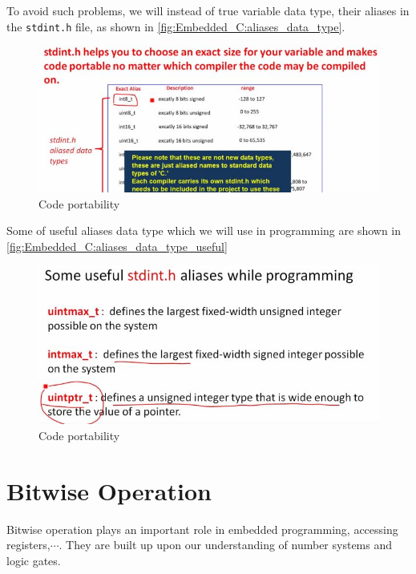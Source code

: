 \newpage
To avoid such problems, we will instead of true variable data type, their aliases in the \verb|stdint.h| file, as shown in \autoref{fig:Embedded_C:aliases_data_type}.


\begin{figure}[h]
\centering
\includegraphics[scale=0.5]{Figures/Embedded_C/aliases_data_type}
\caption{Code portability}
\label{fig:Embedded_C:aliases_data_type}
\end{figure} 


Some of useful aliases data type which we will use in programming are shown in \autoref{fig:Embedded_C:aliases_data_type_useful}

\begin{figure}[h]
\centering
\includegraphics[scale=0.5]{Figures/Embedded_C/aliases_data_type_useful}
\caption{Code portability}
\label{fig:Embedded_C:aliases_data_type_useful}
\end{figure} 

\newpage
\section{Bitwise Operation}

Bitwise operation plays an important role in embedded programming, accessing registers,$\cdots$. They are built up upon our understanding of number systems and logic gates.\\

